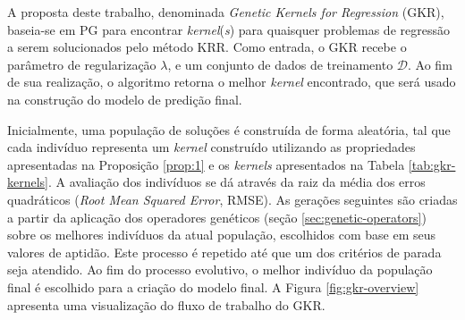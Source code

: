 A proposta deste trabalho, denominada \textit{Genetic Kernels for Regression} (GKR), baseia-se em PG para encontrar \textit{kernel}(\textit{s}) para quaisquer problemas de regressão a serem solucionados pelo método KRR. Como entrada, o GKR recebe o parâmetro de regularização $\lambda$, e um conjunto de dados de treinamento $\mathcal{D}$. Ao fim de sua realização, o algoritmo retorna o melhor \textit{kernel} encontrado, que será usado na construção do modelo de predição final.

Inicialmente, uma população de soluções é construída de forma aleatória, tal que cada indivíduo representa um \textit{kernel} construído utilizando as propriedades apresentadas na Proposição \ref{prop:1} e os \textit{kernels} apresentados na Tabela \ref{tab:gkr-kernels}. A avaliação dos indivíduos se dá através da raiz da média dos erros quadráticos (\textit{Root Mean Squared Error}, RMSE). As gerações seguintes são criadas a partir da aplicação dos operadores genéticos (seção \ref{sec:genetic-operators}) sobre os melhores indivíduos da atual população, escolhidos com base em seus valores de aptidão. Este processo é repetido até que um dos critérios de parada seja atendido. Ao fim do processo evolutivo, o melhor indivíduo da população final é escolhido para a criação do modelo final. A Figura \ref{fig:gkr-overview} apresenta uma visualização do fluxo de trabalho do GKR.

